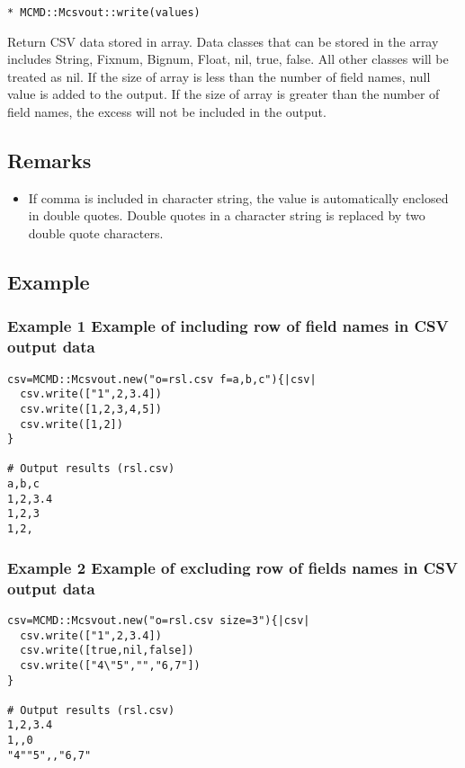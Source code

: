 {\Large
\begin{verbatim}
* MCMD::Mcsvout::write(values)
\end{verbatim}
}

\begin{description}
\setlength{\itemindent}{0mm}
\item[values ] Return CSV data stored in array. Data classes that can be stored in the array includes String, Fixnum, Bignum, Float, nil, true, false. 
All other classes will be treated as nil. 
If the size of array is less than the number of field names, null value is added to the output. 
If the size of array is greater than the number of field names, the excess will not be included in the output. 
\end{description}

\subsection{Remarks}
\begin{itemize}
\item If comma is included in character string, the value is automatically enclosed in double quotes. Double quotes in a character string is replaced by two double quote characters.

\end{itemize}

\subsection{Example}
\subsubsection*{Example 1 Example of including row of field names in CSV output data}

\begin{Verbatim}[baselinestretch=0.7,frame=single]
csv=MCMD::Mcsvout.new("o=rsl.csv f=a,b,c"){|csv|
  csv.write(["1",2,3.4])
  csv.write([1,2,3,4,5])
  csv.write([1,2])
}

# Output results (rsl.csv)
a,b,c
1,2,3.4
1,2,3
1,2,
\end{Verbatim}

\subsubsection*{Example 2 Example of excluding row of fields names in CSV output data}

\begin{Verbatim}[baselinestretch=0.7,frame=single]
csv=MCMD::Mcsvout.new("o=rsl.csv size=3"){|csv|
  csv.write(["1",2,3.4])
  csv.write([true,nil,false])
  csv.write(["4\"5","","6,7"])
}

# Output results (rsl.csv)
1,2,3.4
1,,0
"4""5",,"6,7"
\end{Verbatim}

